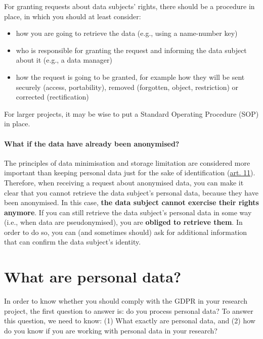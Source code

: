 \documentclass[
]{book}
\providecommand{\tightlist}{%
  \setlength{\itemsep}{0pt}\setlength{\parskip}{0pt}}
\begin{document}
For granting requests about data subjects' rights, there should be a procedure
in place, in which you should at least consider:

\begin{itemize}
\tightlist
\item
  how you are going to retrieve the data (e.g., using a name-number key)
\item
  who is responsible for granting the request and informing the data subject
  about it (e.g., a data manager)
\item
  how the request is going to be granted, for example how they will be sent
  securely (access, portability), removed (forgotten, object, restriction) or
  corrected (rectification)
\end{itemize}

For larger projects, it may be wise to put a Standard Operating Procedure (SOP)
in place.

\hypertarget{what-if-the-data-have-already-been-anonymised}{%
\subsubsection{What if the data have already been anonymised?}\label{what-if-the-data-have-already-been-anonymised}}

The principles of data minimisation and storage limitation are considered more
important than keeping personal data just for the sake of identification
(\href{https://gdpr-info.eu/art-11-gdpr/}{art. 11}).
Therefore, when receiving a request about anonymised data, you can make it clear
that you cannot retrieve the data subject's personal data, because they have
been anonymised. In this case, \textbf{the data subject cannot exercise their rights
anymore}. If you can still retrieve the data subject's personal data in some
way (i.e., when data are pseudonymised), you are \textbf{obliged to retrieve them}.
In order to do so, you can (and sometimes should) ask for additional information
that can confirm the data subject's identity.

\hypertarget{personal-data}{%
\chapter{What are personal data?}\label{personal-data}}

In order to know whether you should comply with the GDPR in your research
project, the first question to answer is: do you process personal data? To
answer this question, we need to know: (1) What exactly are personal data,
and (2) how do you know if you are working with personal data in your research?
\end{document}
